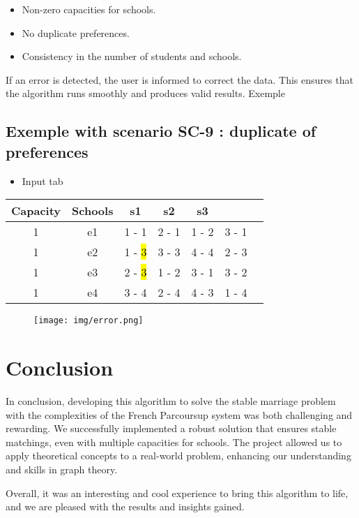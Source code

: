 \documentclass{article}
\begin{document}
\begin{itemize}
    \item Non-zero capacities for schools.
    \item No duplicate preferences.
    \item Consistency in the number of students and schools.
\end{itemize}

If an error is detected, the user is informed to correct the data. This ensures that the algorithm runs smoothly and produces valid results.
Exemple

\subsection{Exemple with scenario SC-9 : duplicate of preferences}

\begin{itemize}
    \item Input tab
\end{itemize}


\begin{tabular}{|c|c|c|c|c|c|c|}
    \hline
    \textbf{Capacity} & \textbf{Schools} & \textbf{s1} & \textbf{s2} & \textbf{s3} &       \\
    \hline
    1                 & e1               & 1 - 1       & 2 - 1       & 1 - 2       & 3 - 1 \\
    \hline
    1                 & e2               & 1 -\hl{ 3 }     & 3 - 3       & 4 - 4       & 2 - 3 \\
    \hline
    1                 & e3               & 2 -\hl{ 3 }        & 1 - 2       & 3 - 1       & 3 - 2 \\
    \hline
    1                 & e4               & 3 - 4       & 2 - 4       & 4 - 3       & 1 - 4 \\
    \hline
\end{tabular}

\begin{figure}[h]
    \hspace{0.5cm}
    \texttt{[image: img/error.png]}
\end{figure}

\section{Conclusion}
\hspace{0.5cm}
In conclusion, developing this algorithm to solve the stable marriage problem with the complexities of the French Parcoursup system was both challenging and rewarding. We successfully implemented a robust solution that ensures stable matchings, even with multiple capacities for schools. The project allowed us to apply theoretical concepts to a real-world problem, enhancing our understanding and skills in graph theory.

Overall, it was an interesting and cool experience to bring this algorithm to life, and we are pleased with the results and insights gained.
\end{document}
